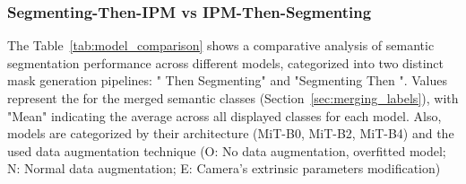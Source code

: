 \subsubsection{Segmenting-Then-IPM vs IPM-Then-Segmenting} \label{sec:bev2seg_2_comparison}
The Table~\ref{tab:model_comparison} shows a comparative analysis of semantic segmentation performance across different models, categorized into two distinct  mask generation pipelines: " Then Segmenting" and "Segmenting Then ". Values represent the  for the merged semantic classes (Section~\ref{sec:merging_labels}), with "Mean" indicating the average  across all displayed classes for each model. Also, models are categorized by their architecture (MiT-B0, MiT-B2, MiT-B4) and the used data augmentation technique (O: No data augmentation, overfitted model; N: Normal data augmentation; E: Camera's extrinsic parameters modification)

